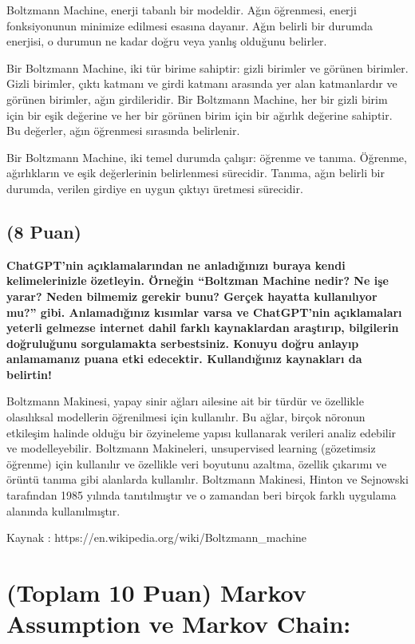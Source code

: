 \documentclass[11pt]{article}
\begin{document}
Boltzmann Machine, enerji tabanlı bir modeldir. Ağın öğrenmesi, enerji fonksiyonunun minimize edilmesi esasına dayanır. Ağın belirli bir durumda enerjisi, o durumun ne kadar doğru veya yanlış olduğunu belirler.

Bir Boltzmann Machine, iki tür birime sahiptir: gizli birimler ve görünen birimler. Gizli birimler, çıktı katmanı ve girdi katmanı arasında yer alan katmanlardır ve görünen birimler, ağın girdileridir. Bir Boltzmann Machine, her bir gizli birim için bir eşik değerine ve her bir görünen birim için bir ağırlık değerine sahiptir. Bu değerler, ağın öğrenmesi sırasında belirlenir.

Bir Boltzmann Machine, iki temel durumda çalışır: öğrenme ve tanıma. Öğrenme, ağırlıkların ve eşik değerlerinin belirlenmesi sürecidir. Tanıma, ağın belirli bir durumda, verilen girdiye en uygun çıktıyı üretmesi sürecidir.

\subsection{(8 Puan)} \textbf{ChatGPT’nin açıklamalarından ne anladığınızı buraya kendi kelimelerinizle özetleyin. Örneğin ``Boltzman Machine nedir? Ne işe yarar? Neden bilmemiz gerekir bunu? Gerçek hayatta kullanılıyor mu?'' gibi. Anlamadığınız kısımlar varsa ve ChatGPT’nin açıklamaları yeterli gelmezse internet dahil farklı kaynaklardan araştırıp, bilgilerin doğruluğunu sorgulamakta serbestsiniz. Konuyu doğru anlayıp anlamamanız puana etki edecektir. Kullandığınız kaynakları da belirtin!}

Boltzmann Makinesi, yapay sinir ağları ailesine ait bir türdür ve özellikle olasılıksal modellerin öğrenilmesi için kullanılır. Bu ağlar, birçok nöronun etkileşim halinde olduğu bir özyineleme yapısı kullanarak verileri analiz edebilir ve modelleyebilir. Boltzmann Makineleri, unsupervised learning (gözetimsiz öğrenme) için kullanılır ve özellikle veri boyutunu azaltma, özellik çıkarımı ve örüntü tanıma gibi alanlarda kullanılır. Boltzmann Makinesi, Hinton ve Sejnowski tarafından 1985 yılında tanıtılmıştır ve o zamandan beri birçok farklı uygulama alanında kullanılmıştır.

Kaynak : https://en.wikipedia.org/wiki/Boltzmann_machine

\section{(Toplam 10 Puan) Markov Assumption ve Markov Chain:}
\end{document}
